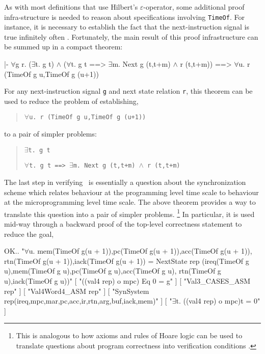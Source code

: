 As with most definitions that use Hilbert's
$\varepsilon$-operator,
some additional proof infra-structure is needed to
reason about specifications involving \verb"TimeOf".
For instance,
it is necessary to establish the fact that the
next-instruction signal is true
infinitely often \cite{Joyce:tech100,Melham:calgary86}.
Fortunately,
the main result of
this proof infrastructure can be summed up in a compact theorem:

\begintt
|- \(\forall\)g r.
     (\(\exists\)t. g t) \(\wedge\) (\(\forall\)t. g t ==> \(\exists\)m. Next g (t,t+m) \(\wedge\) r (t,t+m))
     ==>
     \(\forall\)u. r (TimeOf g u,TimeOf g (u+1))
\endtt

For any next-instruction signal \verb"g" and next state relation \verb"r",
this theorem can be used to reduce the problem of establishing,

\begin{quote}
$\forall$\verb"u. r (TimeOf g u,TimeOf g (u+1))"
\end{quote}

\noindent
to a pair of simpler problems:

\begin{quote}
$\exists$\verb"t. g t"

$\forall$\verb"t. g t ==> "$\exists$\verb"m. Next g (t,t+m) "$\wedge$\verb" r (t,t+m)"
\end{quote}

The last step in verifying \Tamarack\
is essentially a question about the synchronization scheme
which relates behaviour at the programming level time scale
to behaviour at the microprogramming level time scale.
The above theorem provides a way to
translate this question
into a pair of simpler problems.
\footnote{
This is analogous to how
axioms and rules of Hoare logic
can be used to translate questions about program correctness
into verification conditions \cite{Gordon:banff87}.}
In particular, it is used mid-way through a
backward proof of the top-level correctness statement
to reduce the goal,

\begintt
OK..
"\(\forall\)u.
  mem(TimeOf g(u + 1)),pc(TimeOf g(u + 1)),acc(TimeOf g(u + 1)),
  rtn(TimeOf g(u + 1)),iack(TimeOf g(u + 1)) =
  NextState 
  rep
  (ireq(TimeOf g u),mem(TimeOf g u),pc(TimeOf g u),acc(TimeOf g u),
   rtn(TimeOf g u),iack(TimeOf g u))"
    [ "((val4 rep) o mpc) Eq 0 = g" ]
    [ "Val3_CASES_ASM rep" ]
    [ "Val4Word4_ASM rep" ]
    [ "SynSystem rep(ireq,mpc,mar,pc,acc,ir,rtn,arg,buf,iack,mem)" ]
    [ "\(\exists\)t. ((val4 rep) o mpc)t = 0" ]

